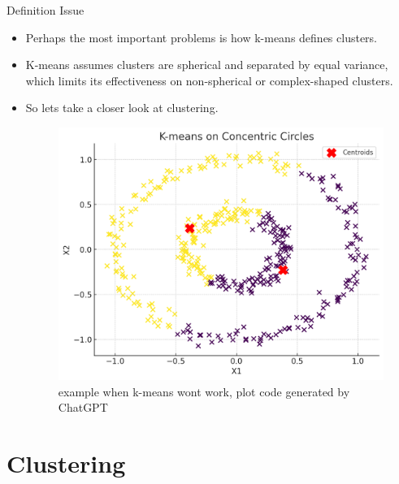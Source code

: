 \documentclass[serif, aspectratio=169]{beamer}
\begin{document}
\begin{frame}{Definition Issue}
    \begin{itemize}
        \item Perhaps the most important problems is how k-means defines clusters.
        \item  K-means assumes clusters are spherical and separated by equal variance, which limits its effectiveness on non-spherical or complex-shaped clusters. 
        \item So lets take a closer look at clustering.

    \begin{figure}
        \centering
        \includegraphics[scale=0.35]{pic/figs/kmeans_anti.png}
        \caption{example when k-means wont work, plot code generated by ChatGPT}
    \end{figure}

    \end{itemize}
\end{frame}


\section{Clustering}
\end{document}
